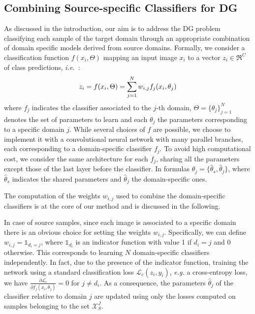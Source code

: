 \documentclass{article}
\newcommand{\ie}{\textit{i.e.~}}
\begin{document}
\subsection{Combining Source-specific Classifiers for DG}
\vspace{-0.3cm}
As discussed in the introduction, our aim is to address the DG problem classifying each sample of the target domain through an appropriate combination of domain specific models derived from source domains. Formally, we consider a classification function $f(x_i, \Theta)$ mapping an input image $x_i$ to a vector $z_i \in \Re^C$
of class predictions, \ie: \vspace{-0.3cm}
\begin{equation}
\label{eq:classifier}
z_i = f(x_i,\Theta)= \sum_{j=1}^N w_{i,j} f_j(x_i,\theta_j)
\vspace{-0.25cm}
 \end{equation}
 where $f_j$ indicates the classifier associated to the $j$-th domain, $\Theta=\{\theta_j\}_{j=1}^N$ denotes the set of parameters to learn and each $\theta_j$ the parameters corresponding to a specific domain $j$. While several choices of $f$ are possible, we choose to implement it with a convolutional neural network with many parallel branches, each corresponding to a domain-specific classifier $f_j$. To avoid high computational cost, we consider the same architecture for each $f_j$, sharing all the parameters except those of the last layer before the classifier. In formulas $\theta_j=\{\hat{\theta}_s,\hat{\theta}_j\}$, where $\hat{\theta}_s$ indicates the shared parameters and $\hat{\theta}_j$ the domain-specific ones.

The computation of the weights $w_{i,j}$ used to combine the domain-specific classifiers is at the core of our method and is discussed in the following.

In case of source samples, since each image is associated to a specific domain there is an obvious choice for setting the weights $w_{i,j}$. Specifically, we can define $w_{i,j}=\mathds{1}_{d_i=j}$, where $\mathds{1}_{d_i}$ is an indicator function with value 1 if $d_i=j$ and 0 otherwise. 
This corresponds to learning $N$ domain-specific classifiers independently. In fact, due to the presence of the indicator function, training the network using a standard classification loss $\mathcal{L}_{c}(z_i,y_i)$, \textit{e.g.} a cross-entropy loss, 
we have $\frac{\partial \mathcal{L}_{c}}{\partial f_j(x_i,\theta_j)}=0$ for $j\neq d_i$. As a consequence, the parameters $\hat\theta_j$ of the classifier relative to domain $j$ are updated using only the losses computed on samples belonging to the set $\mathcal{X}_{S}^J$. 
\end{document}
